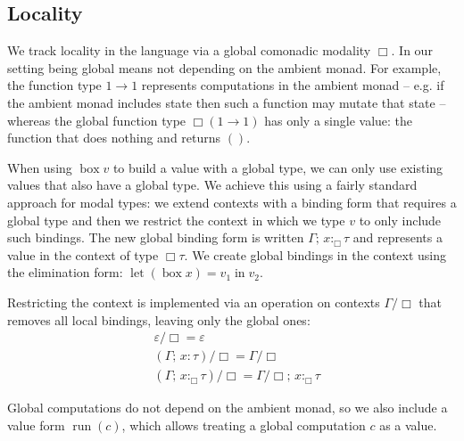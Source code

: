 \documentclass[acmsmall, screen, nonacm]{acmart}
\theoremstyle{definition}
\newcommand{\glob}{\mathop{\Box}}
\newcommand{\types}{\mathrel{:}}
\newcommand{\gtypes}{\mathrel{:_{\Box}}}
\newcommand{\cempty}{\varepsilon}
\newcommand{\ccons}[2]{#1;\,#2}
\newcommand{\lbind}[3]{\ccons{#1}{#2\types#3}}
\newcommand{\gbind}[3]{\ccons{#1}{#2\gtypes#3}}
\newcommand{\cdiv}[1]{#1/\Box}
\newcommand{\gbox}[1]{\mathop{\mathrm{box}} #1}
\newcommand{\gunbox}[3]{\mathop{\mathrm{let}} (\gbox #1) = #2 \mathop{\mathrm{in}} #3}
\newcommand{\grun}[1]{\mathop{\mathrm{run}}(#1)}
\begin{document}
\subsection{Locality}

We track locality in the language via a global comonadic modality
$\glob$. In our setting being global means not depending on the ambient
monad. For example, the function type $1 \rightarrow 1$ represents
computations in the ambient monad -- e.g. if the ambient monad includes
state then such a function may mutate that state -- whereas the global
function type $\glob (1 \rightarrow 1)$ has only a single value: the
function that does nothing and returns $()$.

When using $\gbox{v}$ to build a value with a global type, we can only
use existing values that also have a global type. We achieve this using
a fairly standard approach for modal types: we extend contexts with a
binding form that requires a global type and then we restrict the
context in which we type $v$ to only include such bindings. The new
global binding form is written $\gbind{\Gamma}{x}{\tau}$ and represents
a value in the context of type $\glob \tau$. We create global bindings
in the context using the elimination form: $\gunbox{x}{v_1}{v_2}$.

Restricting the context is implemented via an operation on contexts
$\cdiv{\Gamma}$ that removes all local bindings, leaving only the global
ones:
\begin{align*}
  &\cdiv{\cempty} = \cempty \\
  &\cdiv{(\lbind{\Gamma}{x}{\tau})} = \cdiv{\Gamma} \\
  &\cdiv{(\gbind{\Gamma}{x}{\tau})} = \gbind{\cdiv{\Gamma}}{x}{\tau}
\end{align*}

Global computations do not depend on the ambient monad, so we also
include a value form $\grun{c}$, which allows treating a global
computation $c$ as a value.
\end{document}
